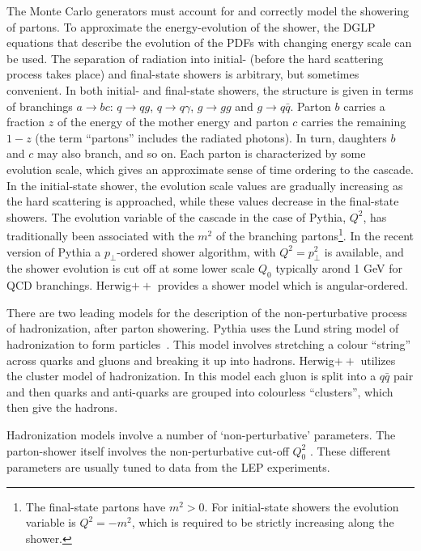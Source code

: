The Monte Carlo generators must account for and correctly model the showering of partons. To approximate the energy-evolution of the shower, the DGLP equations that describe the evolution of the PDFs with changing energy scale can be used. The separation of radiation into initial- (before the hard scattering process takes place) and final-state showers is arbitrary, but sometimes convenient.  In both initial- and final-state showers, the structure is given in terms of branchings $a \rightarrow bc$: $q \rightarrow qg$, $q \rightarrow q\gamma$, $g \rightarrow gg$ and $g \rightarrow q\bar{q}$. Parton $b$ carries a fraction $z$ of the energy of the mother energy and parton $c$ carries the remaining $1-z$ (the term ``partons'' includes the radiated photons).  In turn, daughters $b$ and $c$ may also branch, and so on. Each parton is characterized by some evolution scale, which gives an approximate sense of time ordering to the cascade. In the initial-state shower,  the evolution scale values are gradually increasing as the hard scattering is approached, while  these values decrease in the final-state showers. The evolution variable of the cascade in the case of {\sc Pythia}, $Q^2$, has traditionally been associated with the $m^2$ of the branching partons\footnote{The final-state partons have $m^2>0$. For initial-state showers the evolution variable is $Q^2=-m^2$, which is required to be strictly increasing along the shower.}. In the recent version of {\sc Pythia} a $p_{\perp}$-ordered shower algorithm, with $Q^2=p_{\perp}^2$ is available, and the shower evolution is cut off at some lower scale  $Q_0$ typically arond 1 GeV for QCD branchings. {\sc Herwig}$++$ provides a shower model which is angular-ordered.

There are two leading models for the description of the non-perturbative process of hadronization, after parton showering. {\sc Pythia} uses the Lund string model of hadronization to form particles~\cite{LUNDMODEL}.  This model involves stretching a colour ``string'' across quarks and gluons and breaking it up into hadrons.%
{\sc Herwig}$++$ utilizes the cluster model of hadronization. In this model each gluon is split into a $q\bar{q}$ pair and then quarks and anti-quarks are grouped into colourless ``clusters'', which then give the hadrons.

Hadronization models involve a number of ‘non-perturbative’ parameters. The parton-shower itself involves the non-perturbative cut-off $Q^2_0$ . These different parameters are usually tuned to data from the LEP experiments.


